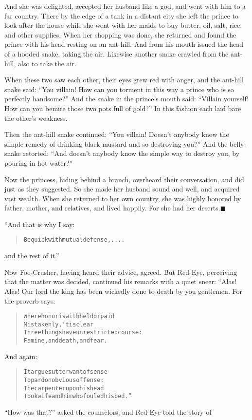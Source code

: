 \documentclass[article, twoside, 14pt]{memoir}
\newcommand{\qed}{\hfill \ensuremath{\blacksquare}}
\renewenvironment{verbatim}{%
\begin{quote}%
\vskip -10pt%
\begin{alltt}\normalfont\large}{\end{alltt}%
\end{quote}%
\vskip -10pt
} %
\begin{document}
And she was delighted, accepted her husband like a god, and went
with him to a far country. There by the edge of a tank in a distant
city she left the prince to look after the house while she
went with her maids to buy butter, oil, salt, rice, and other
supplies. When her shopping was done, she returned and found the
prince with his head resting on an ant-hill. And from his mouth
issued the head of a hooded snake, taking the air. Likewise another
snake crawled from the ant-hill, also to take the air.

When these two saw each other, their eyes grew red with anger, and
the ant-hill snake said:
``You villain! How can you torment in this way a prince who is so perfectly handsome?''
And the snake in the prince's mouth said:
``Villain yourself! How can you bemire those two pots full of gold?''
In this fashion each laid bare the other's weakness.

Then the ant-hill snake continued:
``You villain! Doesn't anybody know the simple remedy of drinking black mustard and so destroying you?''
And the belly-snake retorted:
``And doesn't anybody know the simple way to destroy you, by pouring in hot water?''

Now the princess, hiding behind a branch, overheard their
conversation, and did just as they suggested. So she made her
husband sound and well, and acquired vast wealth. When she returned
to her own country, she was highly honored by father, mother, and
relatives, and lived happily. For she had her
deserts.\hyperref[s58]{\qed}

“And that is why I say:

\begin{verbatim}
Be quick with mutual defense, ....
\end{verbatim}
and the rest of it.”

Now Foe-Crusher, having heard their advice, agreed. But Red-Eye,
perceiving that the matter was decided, continued his remarks with
a quiet sneer: “Alas! Alas! Our lord the king has been wickedly
done to death by you gentlemen. For the proverb says:

\begin{verbatim}
Where honor is withheld or paid
    Mistakenly, 'tis clear
Three things have unrestricted course:
    Famine, and death, and fear.
\end{verbatim}
And again:

\begin{verbatim}
It argues utter want of sense
To pardon obvious offense:
The carpenter upon his head
Took wife and him who fouled his bed.”
\end{verbatim}
``How was that?'' asked the counselors, and Red-Eye told the story
of
\end{document}
